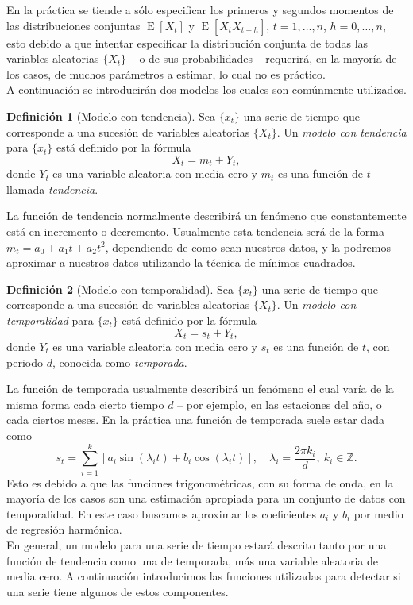 \documentclass[11pt,letterpaper]{article}
\newcommand{\expected}{\ensuremath{\operatorname{E}}}
\theoremstyle{definition}
\newtheorem{definition}{Definición}[section]
\theoremstyle{theorem}
\theoremstyle{remark}
\begin{document}
	En la práctica se tiende a sólo especificar los primeros y segundos momentos de las distribuciones conjuntas \(\expected[X_t]\) y \(\expected[X_tX_{t+h}]\), \(t=1,\dots,n\), \(h=0,\dots,n\), esto debido a que intentar especificar la distribución conjunta de todas las variables aleatorias \(\{X_t\}\) -- o de sus probabilidades -- requerirá, en la mayoría de los casos, de muchos parámetros a estimar, lo cual no es práctico. \\
	A continuación se introducirán dos modelos los cuales son comúnmente utilizados.
	\begin{definition}[Modelo con tendencia]
		Sea \(\{x_t\}\) una serie de tiempo que corresponde a una sucesión de variables aleatorias \(\{X_t\}\). Un \textit{modelo con tendencia} para \(\{x_t\}\) está definido por la fórmula
		\[X_t=m_t+Y_t,\]
		donde \(Y_t\) es una variable aleatoria con media cero y \(m_t\) es una función de \(t\) llamada \textit{tendencia}.
	\end{definition}
	La función de tendencia normalmente describirá un fenómeno que constantemente está en incremento o decremento. Usualmente esta tendencia será de la forma \(m_t=a_0+a_1t+a_2t^2\), dependiendo de como sean nuestros datos, y la podremos aproximar a nuestros datos utilizando la técnica de mínimos cuadrados.
	\begin{definition}[Modelo con temporalidad]
		Sea \(\{x_t\}\) una serie de tiempo que corresponde a una sucesión de variables aleatorias \(\{X_t\}\). Un \textit{modelo con temporalidad} para \(\{x_t\}\) está definido por la fórmula
		\[X_t=s_t+Y_t,\]
		donde \(Y_t\) es una variable aleatoria con media cero y \(s_t\) es una función de \(t\), con periodo \(d\), conocida como \textit{temporada}.
	\end{definition}
	La función de temporada usualmente describirá un fenómeno el cual varía de la misma forma cada cierto tiempo \(d\) -- por ejemplo, en las estaciones del año, o cada ciertos meses. En la práctica una función de temporada suele estar dada como
	\[s_t=\sum_{i=1}^{k}\left[a_i\sin(\lambda_i t)+b_i\cos(\lambda_i t)\right],\quad\lambda_i=\frac{2\pi k_i}{d},\ k_i\in\mathbb{Z}.\]
	Esto es debido a que las funciones trigonométricas, con su forma de onda, en la mayoría de los casos son una estimación apropiada para un conjunto de datos con temporalidad. En este caso buscamos aproximar los coeficientes \(a_i\) y \(b_i\) por medio de regresión harmónica. \\
	En general, un modelo para una serie de tiempo estará descrito tanto por una función de tendencia como una de temporada, más una variable aleatoria de media cero. A continuación introducimos las funciones utilizadas para detectar si una serie tiene algunos de estos componentes.
\end{document}
